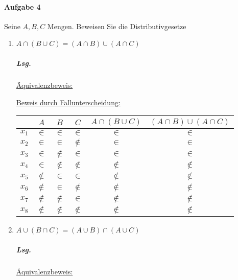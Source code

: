 \documentclass{scrreprt}
\begin{document}
\paragraph{Aufgabe 4} Seine $A, B, C$ Mengen.
Beweisen Sie die Distributivgesetze
\begin{enumerate}[(1)]
\item $A \cap (B \cup C) = (A \cap B) \cup (A \cap C)$

  \subparagraph{Lsg.} \underline{Äquivalenzbeweis:}

  \underline{Beweis durch Fallunterscheidung:}
  \begin{center}
    \begin{tabular}{c | c | c | c | c | c}
      & $A$ & $B$ & $C$ & $A \cap (B \cup C)$ & $(A \cap B) \cup (A \cap C)$  \\
      \hline
      $x_1$ & $\in$ & $\in$ & $\in$ & $\in$ & $\in$ \\
      $x_2$ & $\in$ & $\in$ & $\notin$ & $\in$ & $\in$ \\
      $x_3$ & $\in$ & $\notin$ & $\in$ & $\in$ & $\in$ \\
      $x_4$ & $\in$ & $\notin$ & $\notin$ & $\notin$ & $\notin$ \\
      $x_5$ & $\notin$ & $\in$ & $\in$ & $\notin$ & $\notin$ \\
      $x_6$ & $\notin$ & $\in$ & $\notin$ & $\notin$ & $\notin$ \\
      $x_7$ & $\notin$ & $\notin$ & $\in$ & $\notin$ & $\notin$ \\
      $x_8$ & $\notin$ & $\notin$ & $\notin$ & $\notin$ & $\notin$ \\
    \end{tabular}
  \end{center}

\item $A \cup (B \cap C) = (A \cup B) \cap (A \cup C)$

  \subparagraph{Lsg.} \underline{Äquivalenzbeweis:}


\end{enumerate}
\end{document}
